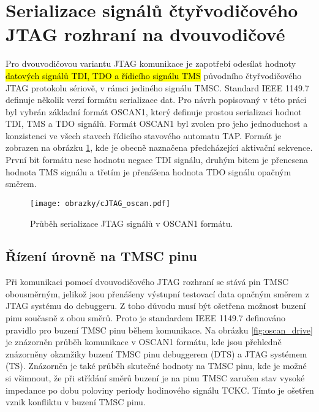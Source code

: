 \section{Serializace signálů čtyřvodičového \acs{JTAG} rozhraní na dvouvodičové}	\label{sec:oscan1} 
Pro dvouvodičovou variantu \acs{JTAG} komunikace je zapotřebí odesílat hodnoty \hl{datových signálů {\acs{TDI}}, {\acs{TDO}} a řídicího signálu {\acs{TMS}}} původního čtyřvodičového \acs{JTAG} protokolu sériově, v rámci jediného signálu \acs{TMSC}. Standard IEEE 1149.7 definuje několik verzí formátu serializace dat. Pro návrh popisovaný v této práci byl vybrán základní formát OSCAN1, který definuje prostou serializaci hodnot \acs{TDI}, \acs{TMS} a \acs{TDO} signálů. Formát OSCAN1 byl zvolen pro jeho jednoduchost a konzistenci ve všech stavech řídicího stavového automatu \acs{TAP}. Formát je zobrazen na obrázku \ref{fig:oscan}, kde je obecně naznačena předcházející aktivační sekvence. První bit formátu nese hodnotu negace \acs{TDI} signálu, druhým bitem je přenesena hodnota \acs{TMS} signálu a třetím je přenášena hodnota \acs{TDO} signálu opačným směrem. \cite{IEEE_1149-7}

\begin{figure}[!h]
  \begin{center}
    \texttt{[image: obrazky/cJTAG\_oscan.pdf]}
  \end{center}
  \caption{Průběh serializace \acs{JTAG} signálů v OSCAN1 formátu.}
	\label{fig:oscan}
\end{figure}
    
\subsection{Řízení úrovně na \acs{TMSC} pinu}	\label{subsec:oscan1_drive} 
Při komunikaci pomocí dvouvodičového \acs{JTAG} rozhraní se stává pin \acs{TMSC} obousměrným, jelikož jsou přenášeny výstupní testovací data opačným směrem z \acs{JTAG} systému do debuggeru. Z toho důvodu musí být ošetřena možnost buzení pinu současně z obou směrů. Proto je standardem IEEE 1149.7 definováno pravidlo pro buzení \acs{TMSC} pinu během komunikace. Na obrázku \ref{fig:oscan_drive} je znázorněn průběh komunikace v OSCAN1 formátu, kde jsou přehledně znázorněny okamžiky buzení \acs{TMSC} pinu debuggerem (\acs{DTS}) a \acs{JTAG} systémem (\acs{TS}). Znázorněn je také průběh skutečné hodnoty na \acs{TMSC} pinu, kde je možné si všimnout, že při střídání směrů buzení je na pinu \acs{TMSC} zaručen stav vysoké impedance po dobu poloviny periody hodinového signálu \acs{TCKC}. Tímto je ošetřen vznik konfliktu v buzení \acs{TMSC} pinu. \cite{IEEE_1149-7}

